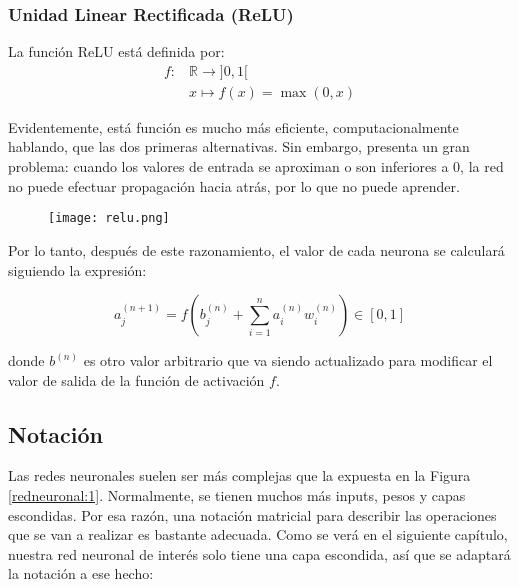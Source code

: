 \subsubsection{Unidad Linear Rectificada (ReLU)}

La función ReLU está definida por:
\begin{align*}
    f \colon & \mathbb{R} \longrightarrow ]0,1[ \\
    \quad    & x \longmapsto f(x) = \max(0,x)
\end{align*}

Evidentemente, está función es mucho más eficiente, computacionalmente hablando, que las dos primeras alternativas. Sin embargo, presenta un gran problema: cuando los valores de entrada se aproximan o son inferiores a 0, la red no puede efectuar propagación hacia atrás, por lo que no puede aprender.

\begin{figure}[H]
    \texttt{[image: relu.png]}
    \centering
\end{figure}


Por lo tanto, después de este razonamiento, el valor de cada neurona se calculará siguiendo la expresión:

\begin{equation}
    \label{eqn:1}
    a^{(n+1)}_j = f\left( b^{(n)}_j + \sum_{i=1}^n a^{(n)}_i w^{(n)}_i \right) \in [0,1]
\end{equation}

donde $b^{(n)}$ es otro valor arbitrario que va siendo actualizado para modificar el valor de salida de la
función de activación $f$.

\subsection{Notación}

Las redes neuronales suelen ser más complejas que la expuesta en la Figura \ref{redneuronal:1}. Normalmente,
se tienen muchos más inputs, pesos y capas escondidas. Por esa razón, una notación matricial para describir
las operaciones que se van a realizar es bastante adecuada. Como se verá en el siguiente capítulo, nuestra
red neuronal de interés solo tiene una capa escondida, así que se adaptará la notación a ese hecho:

